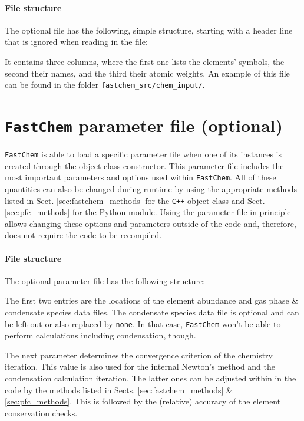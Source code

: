 \documentclass[numbers=noenddot]{aux/fcmanual}
\newcommand{\fc}{\texttt{FastChem}\xspace}
\newcommand{\cpp}{\ttt{C++}\xspace}
\newcommand{\ttt}[1]{\texttt {#1}}
\begin{document}
\paragraph{File structure}
The optional file has the following, simple structure, starting with a header line that is ignored when reading in the file:

It contains three columns, where the first one lists the elements' symbols, the second their names, and the third their atomic weights. An example of this file can be found in the folder \texttt{fastchem\_src/chem\_input/}.


\section{\fc parameter file (optional)}
\label{sec:fc_parameter_file}
\fc is able to load a specific parameter file when one of its instances is created through the object class constructor. This parameter file includes the most important parameters and options used within \fc. All of these quantities can also be changed during runtime by using the appropriate methods listed in Sect. \ref{sec:fastchem_methods} for the \cpp object class and Sect. \ref{sec:pfc_methods} for the Python module. Using the parameter file in principle allows changing these options and parameters outside of the code and, therefore, does not require the code to be recompiled.

\paragraph{File structure}
The optional parameter file has the following structure:

The first two entries are the locations of the element abundance and gas phase \& condensate species data files. 
The condensate species data file is optional and can be left out or also replaced by \verb|none|. In that case, \fc won't be able to perform calculations including condensation, though.

The next parameter determines the convergence criterion of the chemistry iteration. This value is also used for the internal Newton's method and the condensation calculation iteration. The latter ones can be adjusted within in the code by the methods listed in Sects. \ref{sec:fastchem_methods} \& \ref{sec:pfc_methods}. This is followed by the (relative) accuracy of the element conservation checks. 
\end{document}
